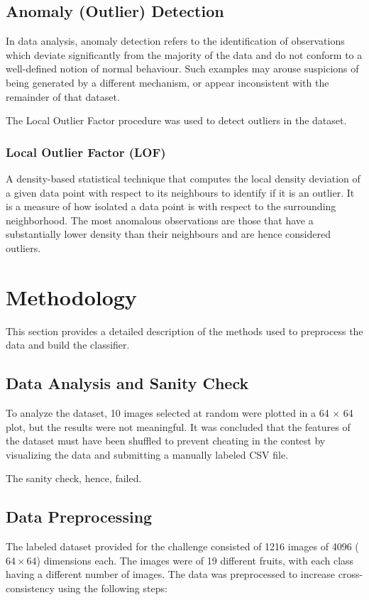 \documentclass[conference]{IEEEtran}
\begin{document}
    \subsection{Anomaly (Outlier) Detection}
    \label{sec:outlier}
    In data analysis, anomaly detection refers to the identification of observations which deviate significantly from the majority of the data and
    do not conform to a well-defined notion of normal behaviour.
    Such examples may arouse suspicions of being generated by a different mechanism, or appear inconsistent with the remainder of that dataset.

    The Local Outlier Factor procedure was used to detect outliers in the dataset.
    \vspace*{3.0pt}

    \subsubsection{Local Outlier Factor (LOF)}
    \label{sec:lof}
    A density-based statistical technique that computes the local density deviation of a given data point with respect to its neighbours to identify if it is an outlier.
    It is a measure of how isolated a data point is with respect to the surrounding neighborhood.
    The most anomalous observations are those that have a substantially lower density than their neighbours and are hence considered outliers.

    \section{Methodology}
    \label{sec:methodology}
    This section provides a detailed description of the methods used to preprocess the data and build the classifier.

    \subsection{Data Analysis and Sanity Check}
    \label{sec:dataanalysis}
    To analyze the dataset, 10 images selected at random were plotted in a 64 $\times$ 64 plot, but the results were not meaningful.
    It was concluded that the features of the dataset must have been shuffled to prevent cheating in the contest by visualizing
    the data and submitting a manually labeled CSV file.

    The sanity check, hence, failed.

    \subsection{Data Preprocessing}
    \label{sec:dataprep}
    The labeled dataset provided for the challenge consisted of 1216 images of 4096 ($64 \times 64$) dimensions each.
    The images were of 19 different fruits, with each class having a different number of images.
    The data was preprocessed to increase cross-consistency using the following steps:
\end{document}

